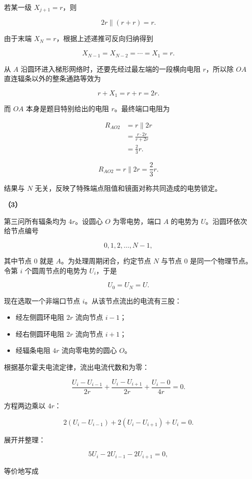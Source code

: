 \documentclass[12pt,a4paper,UTF8]{ctexart}
\newcommand{\tightlist}{\setlength{\itemsep}{0pt}\setlength{\parskip}{0pt}}
\begin{document}
若某一级 \(X_{j+1}=r\)，则

\[2r\parallel(r+r)=r.\]

由于末端 \(X_N=r\)，根据上述递推可反向归纳得到

\[X_{N-1}=X_{N-2}=\cdots=X_1=r.\]

从 \(A\) 沿圆环进入梯形网络时，还要先经过最左端的一段横向电阻
\(r\)，所以除 \(OA\) 直连辐条以外的整条通路等效为

\[r+X_1=r+r=2r.\]

而 \(OA\) 本身是题目特别给出的电阻 \(r\)。最终端口电阻为

\[\begin{aligned}
R_{AO2}
&=r\parallel2r\\
&=\frac{r\cdot2r}{r+2r}\\
&=\frac23r.
\end{aligned}\]

\[\boxed{R_{AO2}=r\parallel2r=\frac23r}.\]

结果与 \(N\) 无关，反映了特殊端点阻值和镜面对称共同造成的电势锁定。

\textbf{（3）}

第三问所有辐条均为 \(4r\)。设圆心 \(O\) 为零电势，端口 \(A\) 的电势为
\(U\)。沿圆环依次给节点编号

\[0,1,2,\ldots,N-1,\]

其中节点 \(0\) 就是 \(A\)。为处理周期闭合，约定节点 \(N\) 与节点 \(0\)
是同一个物理节点。令第 \(i\) 个圆周节点的电势为 \(U_i\)，于是

\[U_0=U_N=U.\]

现在选取一个非端口节点 \(i\)。从该节点流出的电流有三股：

\begin{itemize}
\tightlist
\item
  经左侧圆环电阻 \(2r\) 流向节点 \(i-1\)；
\item
  经右侧圆环电阻 \(2r\) 流向节点 \(i+1\)；
\item
  经辐条电阻 \(4r\) 流向零电势的圆心 \(O\)。
\end{itemize}

根据基尔霍夫电流定律，流出电流代数和为零：

\[\frac{U_i-U_{i-1}}{2r}
+\frac{U_i-U_{i+1}}{2r}
+\frac{U_i-0}{4r}=0.\]

方程两边乘以 \(4r\)：

\[2(U_i-U_{i-1})+2(U_i-U_{i+1})+U_i=0.\]

展开并整理：

\[5U_i-2U_{i-1}-2U_{i+1}=0,\]

等价地写成
\end{document}
